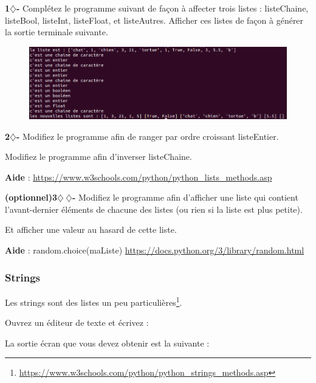 \begin{tcolorbox}[lefttitle=2cm, colframe=gray!75!black, title= \textbf{Exercices}]
\textbf{1$\diamondsuit$-}
Complétez le programme suivant de façon à affecter trois listes : listeChaine, listeBool, listeInt, listeFloat, et listeAutres.
Afficher ces listes de façon à générer la sortie terminale suivante.

\begin{figure}[H]
    \centering
    \includegraphics[scale=0.47]{chapitre2/figures/liste2.png}
\end{figure}


\textbf{2$\diamondsuit$-}
Modifiez le programme afin de ranger par ordre croissant listeEntier.

Modifiez le programme afin d'inverser listeChaine.

\textbf{Aide} : \url{https://www.w3schools.com/python/python_lists_methods.asp}

\textbf{(optionnel)3$\diamondsuit~\diamondsuit$-}
Modifiez le programme afin d'afficher une liste qui contient l'avant-dernier éléments de chacune des listes (ou rien si la liste est plus petite).

Et afficher une valeur au hasard de cette liste.

\textbf{Aide} : random.choice(maListe) \url{https://docs.python.org/3/library/random.html}


\end{tcolorbox}

\subsubsection{Strings}

Les strings sont des listes un peu particulières\footnote{\url{https://www.w3schools.com/python/python_strings_methods.asp}}.

Ouvrez un éditeur de texte et écrivez :



La sortie écran que vous devez obtenir est la suivante : 

